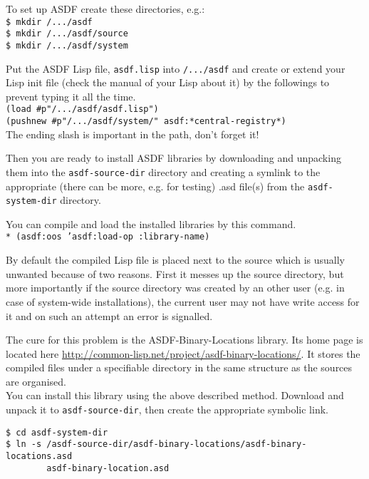 \documentclass[11pt,a4paper,dvipdfm]{article}
\newcommand{\selfref}[1]{\href{#1}{#1}}
\newcommand{\prompttext}[1]{\texttt{#1}}
\newcommand{\shprompt}[1]{\prompttext{\$ #1}}
\newcommand{\lispprompt}[1]{\prompttext{* #1}}
\begin{document}
To set up ASDF create these directories, e.g.: \\
\shprompt{mkdir /.../asdf} \\
\shprompt{mkdir /.../asdf/source} \\
\shprompt{mkdir /.../asdf/system}

Put the ASDF Lisp file, \prompttext{asdf.lisp} into \prompttext{/.../asdf} and
create or extend your Lisp init file (check the manual of your Lisp
about it) by the followings to prevent typing it all the time. \\
\prompttext{(load \#p"/.../asdf/asdf.lisp")} \\
\prompttext{(pushnew \#p"/.../asdf/system/" asdf:*central-registry*)} \\
The ending slash is important in the path, don't forget it!

Then you are ready to install ASDF libraries by downloading and unpacking them
into the \prompttext{asdf-source-dir} directory and creating a symlink to the
appropriate (there can be more, e.g. for testing) .asd file(s) from the
\prompttext{asdf-system-dir} directory.

You can compile and load the installed libraries by this command. \\
\lispprompt{(asdf:oos 'asdf:load-op :library-name)}

By default the compiled Lisp file is placed next to the source which is
usually unwanted because of two reasons. First it messes up the source
directory, but more importantly if the source directory was created by an
other user (e.g. in case of system-wide installations), the current user may
not have write access for it and on such an attempt an error is signalled.

The cure for this problem is the ASDF-Binary-Locations library. Its home
page is located here
\selfref{http://common-lisp.net/project/asdf-binary-locations/}. It stores
the compiled files under a specifiable directory in the same structure as
the sources are organised. \\

You can install this library using the above described method. Download and
unpack it to \prompttext{asdf-source-dir}, then create the appropriate
symbolic link.

\shprompt{cd asdf-system-dir} \\
\shprompt{ln -s
/asdf-source-dir/asdf-binary-locations/asdf-binary-locations.asd \\
\mbox{~~~~~~~~}asdf-binary-location.asd}
\end{document}
